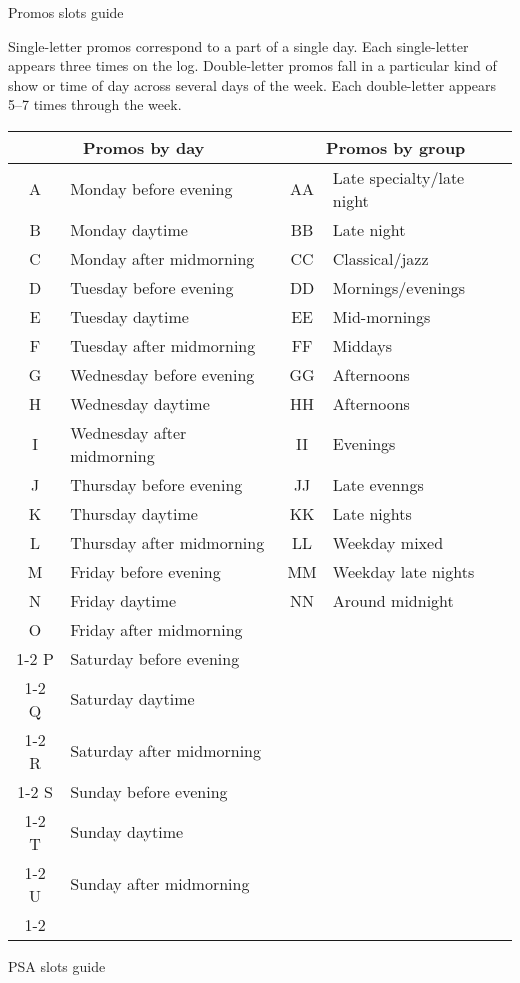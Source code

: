 \documentclass{article}
\begin{document}
\begin{center}
\Large Promos slots guide
\end{center}

Single-letter promos correspond to a part of a single day.  Each
single-letter appears three times on the log.  Double-letter promos
fall in a particular kind of show or time of day across several days
of the week.  Each double-letter appears 5--7 times through the week.

\begin{center}
\def\bothl#1#2#3{#1 & #2 & #1#1 & #3 \\ \hline}
\def\dayl#1#2{#1 & #2 \\ \cline{1-2}}
\begin{tabular}{|c|l||c|l|}
\hline \multicolumn{2}{|c||}{Promos by day} & \multicolumn{2}{c|}{Promos by group} \\ \hline\hline
\bothl A{Monday before evening}{Late specialty/late night}
\bothl B{Monday daytime}{Late night}
\bothl C{Monday after midmorning}{Classical/jazz}
\bothl D{Tuesday before evening}{Mornings/evenings}
\bothl E{Tuesday daytime}{Mid-mornings}
\bothl F{Tuesday after midmorning}{Middays}
\bothl G{Wednesday before evening}{Afternoons}
\bothl H{Wednesday daytime}{Afternoons}
\bothl I{Wednesday after midmorning}{Evenings}
\bothl J{Thursday before evening}{Late evenngs}
\bothl K{Thursday daytime}{Late nights}
\bothl L{Thursday after midmorning}{Weekday mixed}
\bothl M{Friday before evening}{Weekday late nights}
\bothl N{Friday daytime}{Around midnight}
\dayl  O{Friday after midmorning}
\dayl  P{Saturday before evening}
\dayl  Q{Saturday daytime}
\dayl  R{Saturday after midmorning}
\dayl  S{Sunday before evening}
\dayl  T{Sunday daytime}
\dayl  U{Sunday after midmorning}
\end{tabular}
\end{center}
\clearpage
\begin{center}
\Large PSA slots guide
\end{center}
\end{document}

